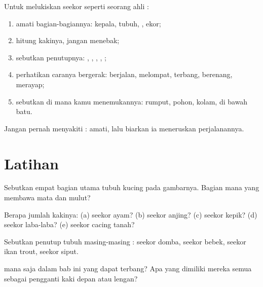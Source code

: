 \begin{method}\label{met:g1:animals-around-us:observe}
Untuk melukiskan seekor  seperti seorang ahli :
\begin{enumerate}
  \item amati bagian-bagiannya: kepala, tubuh, , ekor;
  \item hitung kakinya, jangan menebak;
  \item sebutkan penutupnya: , , , , ;
  \item perhatikan caranya bergerak: berjalan, melompat, terbang,
        berenang, merayap;
  \item sebutkan di mana kamu menemukannya: rumput, pohon, kolam, di
        bawah batu.
\end{enumerate}
Jangan pernah menyakiti : amati, lalu biarkan ia meneruskan
perjalanannya.
\end{method}

\section{Latihan}

\begin{exercise}[$\star$]\label{exo:g1:animals-around-us:1}
Sebutkan empat bagian utama tubuh kucing pada gambarnya. Bagian mana
yang membawa mata dan mulut?
\end{exercise}

\begin{exercise}[$\star$]\label{exo:g1:animals-around-us:2}
Berapa jumlah kakinya: (a) seekor ayam? (b) seekor anjing? (c) seekor
kepik? (d) seekor laba-laba? (e) seekor cacing tanah?
\end{exercise}

\begin{exercise}[$\star$]\label{exo:g1:animals-around-us:3}
Sebutkan penutup tubuh masing-masing : seekor domba, seekor
bebek, seekor ikan trout, seekor siput.
\end{exercise}

\begin{exercise}[$\star$]\label{exo:g1:animals-around-us:4}
 mana saja dalam bab ini yang dapat terbang? Apa yang dimiliki
mereka semua sebagai pengganti kaki depan atau lengan?
\end{exercise}

